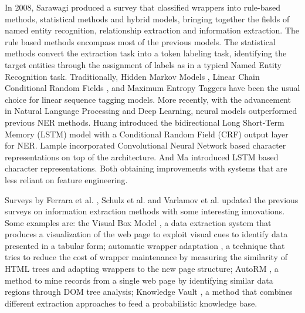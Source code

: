 \documentclass[sigconf]{acmart}
\begin{document}
In 2008, Sarawagi \cite{Sarawagi2008} produced a survey that classified wrappers into
rule-based methods, statistical methods and hybrid models, bringing together 
the fields of named entity recognition, relationship extraction and information extraction. 
The rule based methods encompass most of the 
previous models. The statistical methods convert the extraction task into a token labeling 
task, identifying the target entities through the assignment of labels as in a typical 
Named Entity Recognition task. Traditionally, Hidden Markov Models \cite{Leek1997, Freitag1999}, 
Linear Chain Conditional Random Fields \cite{Lafferty2001}, and Maximum Entropy Taggers 
\cite{McCallum2000} have been the usual choice for linear sequence tagging models.
More recently, with the advancement in Natural Language Processing and Deep Learning, 
neural models outperformed previous NER methods. Huang \cite{Huang2015} introduced the 
bidirectional Long Short-Term Memory (LSTM) model with a Conditional Random Field (CRF) output layer
for NER. Lample \cite{Lample2016} incorporated Convolutional Neural Network based character representations 
on top of the architecture. And Ma \cite{Ma2016} introduced
LSTM based character representations. Both obtaining improvements with systems that are less reliant
on feature engineering.

Surveys by Ferrara et al. \cite{Ferrara2014}, Schulz et al. \cite{Schulz2016} and 
Varlamov et al. \cite{Varlamov2016} updated the previous surveys on information 
extraction methods with some interesting innovations. 
Some examples are: the Visual Box Model \cite{Krupl2005}, a data extraction system that produces 
a visualization of the web page to exploit visual cues to identify data presented in a tabular form;
automatic wrapper adaptation \cite{Ferrara2011}, a technique that tries to reduce the cost of 
wrapper maintenance by measuring the similarity of HTML trees and adapting
wrappers to the new page structure; AutoRM \cite{Shi2015}, a method to mine
records from a single web page by identifying similar data regions through DOM
tree analysis; Knowledge Vault \cite{Dong2014}, a method that combines different 
extraction approaches to feed a probabilistic knowledge base.
\end{document}
